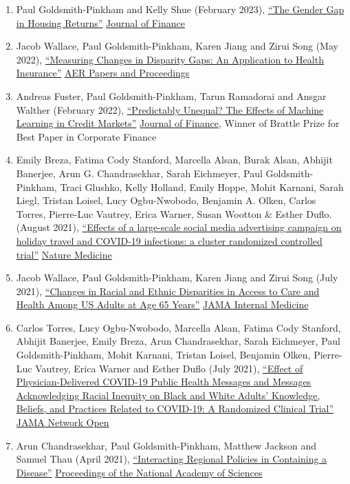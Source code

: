 \documentclass[letterpaper]{article}
\begin{document}
\begin{enumerate}
	\item Paul Goldsmith-Pinkham and Kelly Shue (February 2023), \href{https://paulgp.github.io/papers/Gender_Gap_in_Housing_Returns.pdf}{``The Gender Gap in Housing Returns''} \ul{Journal of Finance}
	\item  Jacob Wallace, Paul Goldsmith-Pinkham, Karen Jiang and Zirui Song (May 2022), \href{https://paulgp.github.io/papers/aerpp_medicare.pdf}{``Measuring Changes in Disparity Gaps: An Application to Health Insurance''} \ul{AER Papers and Proceedings}
	\item Andreas Fuster, Paul Goldsmith-Pinkham, Tarun Ramadorai and Ansgar Walther (February 2022), \href{https://papers.ssrn.com/sol3/papers.cfm?abstract_id=3072038}{``Predictably Unequal? The Effects of Machine Learning in Credit Markets''} \ul{Journal of Finance}, Winner of Brattle Prize for Best Paper in Corporate Finance
	\item Emily Breza, Fatima Cody Stanford, Marcella Alsan, Burak Alsan, Abhijit Banerjee, Arun G. Chandrasekhar, Sarah Eichmeyer, Paul Goldsmith-Pinkham, Traci Glushko, Kelly Holland, Emily Hoppe, Mohit Karnani, Sarah Liegl, Tristan Loisel, Lucy Ogbu-Nwobodo, Benjamin A. Olken, Carlos Torres, Pierre-Luc Vautrey, Erica Warner, Susan Wootton \& Esther Duflo. (August 2021), \href{https://www.nature.com/articles/s41591-021-01487-3.pdf}{``Effects of a large-scale social media advertising campaign on holiday travel and COVID-19 infections: a cluster randomized controlled trial''} \ul{Nature Medicine}
	\item Jacob Wallace, Paul Goldsmith-Pinkham, Karen Jiang and Zirui Song (July 2021), \href{https://jamanetwork.com/journals/jamainternalmedicine/article-abstract/2782345}{``Changes in Racial and Ethnic Disparities in Access to Care and Health Among US Adults at Age 65 Years''} \ul{JAMA Internal Medicine}
	\item Carlos Torres, Lucy Ogbu-Nwobodo, Marcella Alsan, Fatima Cody Stanford, Abhijit Banerjee, Emily Breza, Arun Chandrasekhar, Sarah Eichmeyer, Paul Goldsmith-Pinkham, Mohit Karnani, Tristan Loisel, Benjamin Olken, Pierre-Luc Vautrey, Erica Warner and Esther Duflo (July 2021), \href{https://jamanetwork.com/journals/jamanetworkopen/fullarticle/2781934}{``Effect of Physician-Delivered COVID-19 Public Health Messages and Messages Acknowledging Racial Inequity on Black and White Adults’ Knowledge, Beliefs, and Practices Related to COVID-19: A Randomized Clinical Trial''} \ul{JAMA Network Open}
	\item Arun Chandrasekhar, Paul Goldsmith-Pinkham, Matthew Jackson and Samuel Thau (April 2021), \href{https://arxiv.org/abs/2008.10745}{``Interacting Regional Policies in Containing a Disease''} \ul{Proceedings of the National Academy of Sciences}

\end{enumerate}
\end{document}
